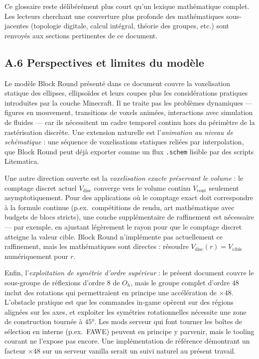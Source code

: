 \documentclass[12pt,a4paper]{scrartcl}
\newcommand{\code}[1]{\texttt{\small #1}}
\begin{document}
Ce glossaire reste délibérément plus court qu'un lexique mathématique complet. Les lecteurs cherchant une couverture plus profonde des mathématiques sous-jacentes (topologie digitale, calcul intégral, théorie des groupes, etc.) sont renvoyés aux sections pertinentes de ce document.

\subsection*{A.6 Perspectives et limites du modèle}

Le modèle Block Round présenté dans ce document couvre la voxelisation statique des ellipses, ellipsoïdes et leurs coupes plus les considérations pratiques introduites par la couche Minecraft. Il ne traite pas les problèmes dynamiques --- figures en mouvement, transitions de voxels animées, interactions avec simulation de fluides --- car ils nécessitent un cadre temporel continu hors du périmètre de la rastérisation discrète. Une extension naturelle est l'\emph{animation au niveau de schématique} : une séquence de voxelisations statiques reliées par interpolation, que Block Round peut déjà exporter comme un flux \code{.schem} lisible par des scripts Litematica.

Une autre direction ouverte est la \emph{voxelisation exacte préservant le volume} : le comptage discret actuel $V_{\mathrm{disc}}$ converge vers le volume continu $V_{\mathrm{cont}}$ seulement asymptotiquement. Pour des applications où le comptage exact doit correspondre à la formule continue (p.ex.\ compétitions de rendu, art mathématique avec budgets de blocs stricts), une couche supplémentaire de raffinement est nécessaire --- par exemple, en ajustant légèrement le rayon pour que le comptage discret atteigne la valeur cible. Block Round n'implémente pas actuellement ce raffinement, mais les mathématiques sont directes : résoudre $V_{\mathrm{disc}}(r) = V_{\mathrm{cible}}$ numériquement pour $r$.

Enfin, l'\emph{exploitation de symétrie d'ordre supérieur} : le présent document couvre le sous-groupe de réflexions d'ordre $8$ de $O_h$, mais le groupe complet d'ordre $48$ inclut des rotations qui permettraient en principe une accélération de $\times 48$. L'obstacle pratique est que les commandes in-game opèrent sur des régions alignées sur les axes, et exploiter les symétries rotationnelles nécessite une zone de construction tournée à $45°$. Les mods serveur qui font tourner les boîtes de sélection en interne (p.ex.\ FAWE) peuvent en principe y parvenir, mais le tooling courant ne l'expose pas encore. Une implémentation de référence démontrant un facteur $\times 48$ sur un serveur vanilla serait un suivi naturel au présent travail.
\end{document}
